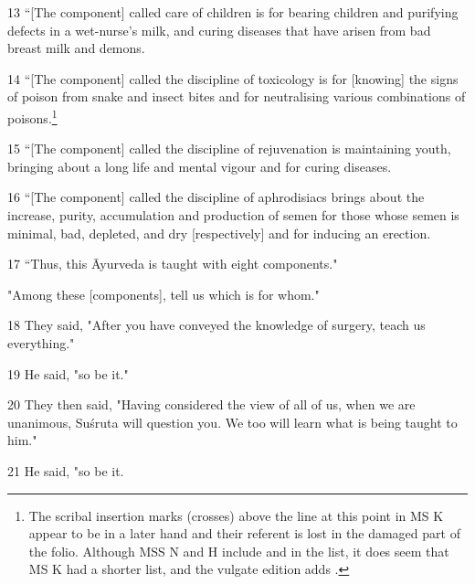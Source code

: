 \documentclass[12pt]{article}
\begin{document}
\begin{translation}
        
        \item[13] “[The component] called care of children is for bearing children and 
        purifying defects in a wet-nurse's milk, and curing diseases that have arisen 
        from bad breast milk and demons.
        
        \item[14] “[The component] called the discipline of toxicology is for
[knowing] the signs of poison from snake and insect bites and for
neutralising various combinations of poisons.\footnote{The scribal
insertion marks (crosses) above the line at this point in MS K appear to
be in a later hand and their referent is lost in the damaged part of the
folio.  Although MSS N and H include  and
 in the list, it does seem that MS K had
a shorter list, and the vulgate edition adds .}
        
        \item[15] “[The component] called the discipline of rejuvenation is 
        maintaining 
        youth, bringing about a long life and mental vigour and for curing diseases.
        
        
        \item[16] “[The component] called the discipline of aphrodisiacs brings about 
        the 
        increase, purity, accumulation and  production of semen for those whose semen 
        is minimal, bad, depleted, and dry [respectively] and for inducing an erection.
        
        \item[17] “Thus, this Āyurveda is taught with eight components."
        
        "Among these [components], tell us which is for whom."
        
        \item[18] They said, "After you have conveyed the knowledge of surgery, 
        teach 
        us everything."
        
        \item[19] He said, "so be it."
        
        \item[20] They then said, "Having considered the view of all of us, when we 
        are 
        unanimous, Suśruta will question you. We too will learn what is being taught to 
        him."
        
        \item[21] He said, "so be it.
        

\end{translation}
\end{document}
